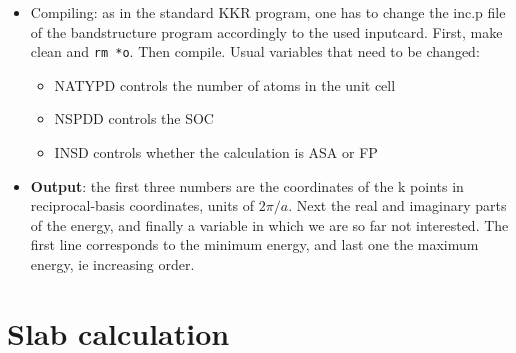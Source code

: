 \documentclass[11pt,fleqn]{book} %
\begin{document}
\begin{itemize}
\item Compiling: as in the standard KKR program, one has to change the inc.p file
of the bandstructure program accordingly to the used inputcard.
First, make clean and \verb|rm *o|. Then compile.
Usual variables that need to be changed:
\begin{itemize}
\item NATYPD controls the number of atoms in the unit cell
\item NSPDD controls the SOC
\item INSD controls whether the calculation
is ASA or FP
\end{itemize}

\item \textbf{Output}: the first three numbers are the
coordinates of the k points in reciprocal-basis coordinates,
units of $2\pi/a$. Next the real and imaginary parts of the energy, and finally
a variable in which we are so far not interested.
The first line corresponds to the minimum energy, and last one
the maximum energy, ie increasing order.
\end{itemize}


\section{Slab calculation}
\label{sec:slab}
\end{document}
